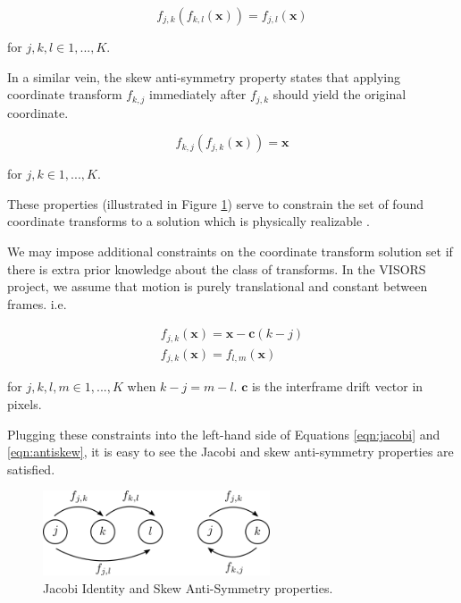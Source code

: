 \documentclass[tocnosub,noragright,centerchapter,12pt]{uiucecethesis09}
\begin{document}
\begin{equation}
  f_{j,k}(f_{k,l}(\bm{x})) = f_{j,l}(\bm{x})
  \label{eqn:jacobi}
\end{equation}

for $j,k,l \in 1, ..., K$.

In a similar vein, the skew anti-symmetry property states that applying coordinate transform $f_{k,j}$ immediately after $f_{j,k}$ should yield the original coordinate.

\begin{equation}
  f_{k,j}(f_{j,k}(\bm{x})) = \bm{x}
  \label{eqn:antiskew}
\end{equation}

for $j,k \in 1, ..., K$.

These properties (illustrated in Figure \ref{fig:properties}) serve to constrain the set of found coordinate transforms to a solution which is physically realizable \cite{milanfar}.

We may impose additional constraints on the coordinate transform solution set if there is extra prior knowledge about the class of transforms.  In the VISORS project, we assume that motion is purely translational and constant between frames. i.e.

\begin{eqnarray}
  f_{j,k}(\bm{x}) = \bm{x} - \bm{c}(k - j) \\
  f_{j,k}(\bm{x}) = f_{l,m}(\bm{x})
  \label{eqn:constant}
\end{eqnarray}

for $j,k,l,m \in 1, ..., K$ when $k - j = m - l$.  $\bm{c}$ is the interframe drift vector in pixels.

Plugging these constraints into the left-hand side of Equations \ref{eqn:jacobi} and \ref{eqn:antiskew}, it is easy to see the Jacobi and skew anti-symmetry properties are satisfied.

\begin{figure}
  \centering
  \includegraphics[width=0.6\textwidth]{figures/properties.png}
  \caption{Jacobi Identity and Skew Anti-Symmetry properties.}
  \label{fig:properties}
\end{figure}

\end{document}
